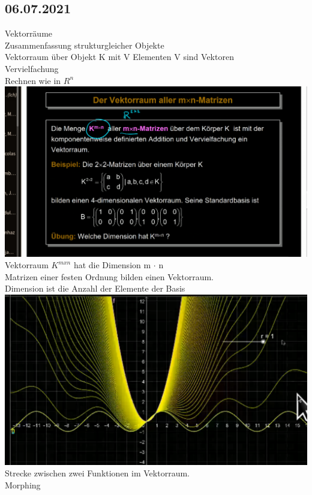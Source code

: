 \documentclass{article}
\begin{document}
	\subsection*{06.07.2021}
	Vektorräume \\
	Zusammenfassung strukturgleicher Objekte \\
	Vektorraum über Objekt K mit V Elementen V sind Vektoren \\
	Vervielfachung \\
	Rechnen wie in $R^{n}$ \\
	\includegraphics[width=\linewidth]{mav} \\
	Vektorraum $K^{mxn}$  hat die Dimension m $\cdot$ n \\
	Matrizen einer festen Ordnung bilden einen Vektorraum. \\
	Dimension ist die Anzahl der Elemente der Basis \\
	\includegraphics[width=\linewidth]{streckeinv} \\
	Strecke zwischen zwei Funktionen im Vektorraum. \\
	Morphing \\
\end{document}
